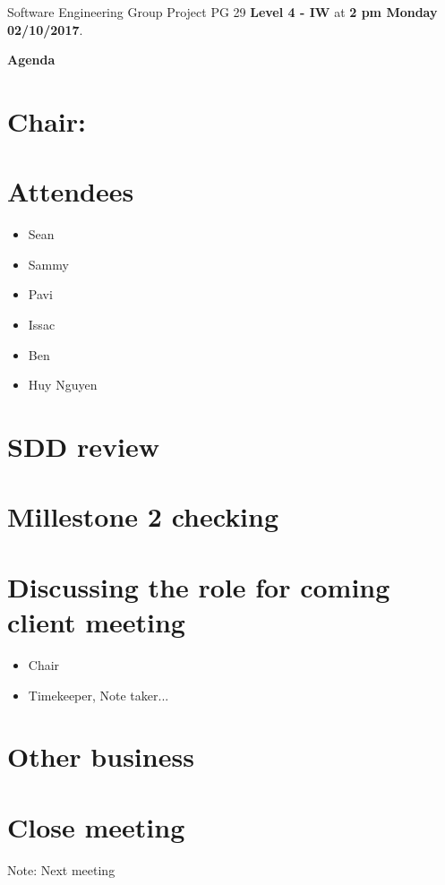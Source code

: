 \documentclass[11pt, a4paper]{article}
\begin{document}
	\noindent Software Engineering Group Project PG 29 {\bf Level 4 - IW} at {\bf 2 pm Monday 02/10/2017}.
	\vspace*{10pt}
	\begin{center}
		\huge \bf Agenda
	\end{center}
	
	\section*{Chair: }
	
	\vspace*{10pt}
	
	\section{Attendees}
	\begin{itemize}
		\item Sean
		\item Sammy
		\item Pavi
		\item Issac
		\item Ben
		\item Huy Nguyen
	\end{itemize}
	
	\section{SDD review}
	
	\section{Millestone 2 checking}
	
	\section{Discussing the role for coming client meeting}
	\begin{itemize}
		\item Chair
		\item Timekeeper, Note taker...
	\end{itemize}
	
	\section{Other business}
	
	\section {Close meeting}
	\vspace*{10pt}
	\noindent Note: Next meeting 
	
\end{document}
